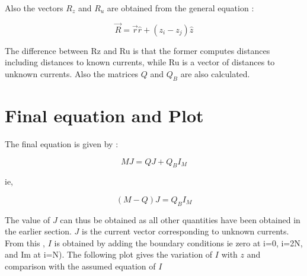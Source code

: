 \documentclass[15pt,a4paper]{article}
\begin{document}
Also the vectors $R_z$ and $R_u$ are obtained from the general equation : 

\begin{equation*}
\vec{R} = \vec{r}\hat{r} + (z_i - z_j)\hat{z} 
\end{equation*}

The difference between Rz and Ru is that the former computes
distances including distances to known currents, while Ru is a vector of distances to
unknown currents. Also the matrices $Q$ and $Q_B$ are also calculated.

\section{Final equation and Plot}
The final equation is given by : 

\begin{equation*}
MJ = QJ + Q_B I_M 
\end{equation*}

ie, 

\begin{equation*}
(M-Q)J = Q_B I_M 
\end{equation*}

The value of $J$ can thus be obtained as all other quantities have been obtained in the earlier section. $J$ is the current vector corresponding to unknown currents. From this , $I$ is obtained by adding the boundary conditions  ie zero at i=0, i=2N, and Im at i=N). The following plot gives the variation of $I$ with $z$ and comparison with the assumed equation of $I$\\\\\\\\\\\\\\\\\\\\\\\\\\\\\\\\\\\\\\\\\\\\\\\\\\\\\\
\end{document}
